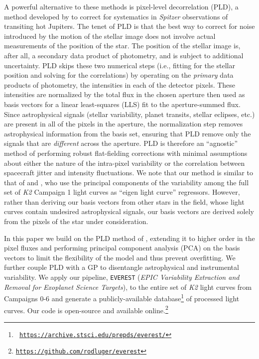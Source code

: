 \documentclass[]{emulateapj}
\newcommand{\note}[1]{{\color{red} #1}}
\begin{document}
A powerful alternative to these methods is pixel-level decorrelation (PLD), a method developed
by \cite{DEM15} to correct for systematics in \emph{Spitzer} observations of transiting
hot Jupiters. The tenet of PLD is that the best way to correct for noise introduced by
the motion of the stellar image does not involve actual measurements of the position
of the star. The position of the stellar image is, after all, a secondary data product
of photometry, and is subject to additional uncertainty.
PLD skips these two numerical steps (i.e., fitting for the stellar position and solving
for the correlations) by operating on the \emph{primary} data products of photometry, the
intensities in each of the detector pixels. 
These intensities are normalized by the
total flux in the chosen aperture then used as basis vectors for a linear least-squares 
(LLS) fit to the aperture-summed flux. Since astrophysical signals (stellar variability,
planet transits, stellar eclipses, etc.) are present in all of the pixels in the aperture,
the normalization step removes astrophysical information from the basis set, ensuring
that PLD remove only the signals that are \emph{different} across the aperture. PLD is
therefore an ``agnostic'' method of performing robust flat-fielding corrections with
minimal assumptions about either the nature of the intra-pixel variability or the correlation 
between spacecraft jitter and intensity fluctuations. We note that our method is similar 
to that of \cite{DFM15} and \cite{MON15}, who use the principal components of the variability 
among the full set of \emph{K2} Campaign 1 light curves as ``eigen light curve'' regressors.
However, rather than deriving our basis vectors from other stars in the field, whose
light curves contain undesired astrophysical signals, our basis vectors are derived
solely from the pixels of the star under consideration.

In this paper we build on the PLD method of \cite{DEM15}, extending it to higher order
in the pixel fluxes and performing principal component analysis (PCA) on the basis
vectors to limit the flexibility of the model and thus prevent overfitting. We further 
couple PLD with a GP to 
disentangle astrophysical and instrumental variability. We apply our pipeline, \texttt{EVEREST}
(\emph{EPIC Variability Extraction and Removal for
Exoplanet Science Targets}), to the entire set of \emph{K2} light curves from Campaigns 0-6 and generate a 
publicly-available database\footnote{\texttt{\note{\url{https://archive.stsci.edu/prepds/everest/}}}}
of processed light curves. Our code is open-source and
available online.\footnote{\texttt{\url{https://github.com/rodluger/everest}}}
\end{document}
